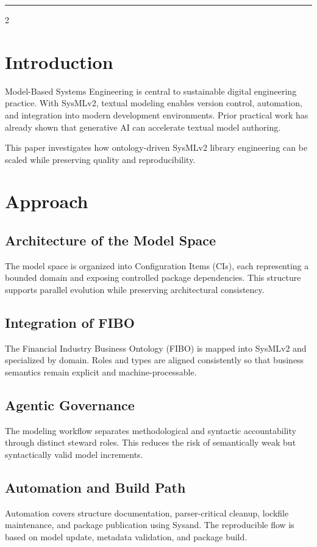 \documentclass{book}
\theoremstyle{remark}
\begin{document}
\noindent \rule{\textwidth}{1pt}
\parskip=0pt
\columnseprule=0pt
\setlength{\columnsep}{1.5em}
\vspace{-12pt}
\begin{multicols}{2}
\section{Introduction}
\vspace{-6pt}
Model-Based Systems Engineering is central to sustainable digital engineering practice. With SysMLv2, textual modeling enables version control, automation, and integration into modern development environments. Prior practical work has already shown that generative AI can accelerate textual model authoring.

This paper investigates how ontology-driven SysMLv2 library engineering can be scaled while preserving quality and reproducibility.

\section{Approach}
\subsection{Architecture of the Model Space}
The model space is organized into Configuration Items (CIs), each representing a bounded domain and exposing controlled package dependencies. This structure supports parallel evolution while preserving architectural consistency.

\subsection{Integration of FIBO}
The Financial Industry Business Ontology (FIBO) is mapped into SysMLv2 and specialized by domain. Roles and types are aligned consistently so that business semantics remain explicit and machine-processable.

\subsection{Agentic Governance}
The modeling workflow separates methodological and syntactic accountability through distinct steward roles. This reduces the risk of semantically weak but syntactically valid model increments.

\subsection{Automation and Build Path}
Automation covers structure documentation, parser-critical cleanup, lockfile maintenance, and package publication using Sysand. The reproducible flow is based on model update, metadata validation, and package build.


\end{multicols}
\end{document}
